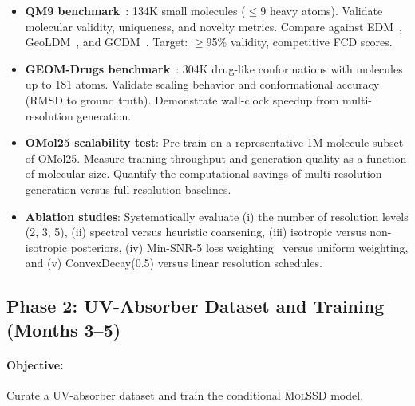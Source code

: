 \documentclass[11pt,a4paper]{article}
\newcommand{\molssd}{\textsc{MolSSD}}
\begin{document}
\begin{itemize}[leftmargin=*]
  \item \textbf{QM9 benchmark}~\citep{ramakrishnan2014qm9}: 134K small molecules
    ($\le$9 heavy atoms). Validate molecular validity, uniqueness, and novelty metrics.
    Compare against EDM~\citep{hoogeboom2022edm}, GeoLDM~\citep{xu2023geoldm}, and
    GCDM~\citep{morehead2024gcdm}. Target: $\ge$95\% validity, competitive FCD scores.

  \item \textbf{GEOM-Drugs benchmark}~\citep{axelrod2022geom}: 304K drug-like
    conformations with molecules up to 181 atoms. Validate scaling behavior and
    conformational accuracy (RMSD to ground truth). Demonstrate wall-clock speedup from
    multi-resolution generation.

  \item \textbf{OMol25 scalability test}: Pre-train on a representative 1M-molecule
    subset of OMol25. Measure training throughput and generation quality as a function
    of molecular size. Quantify the computational savings of multi-resolution generation
    versus full-resolution baselines.

  \item \textbf{Ablation studies}: Systematically evaluate (i) the number of resolution
    levels (2, 3, 5), (ii) spectral versus heuristic coarsening, (iii) isotropic
    versus non-isotropic posteriors, (iv) Min-SNR-5 loss
    weighting~\citep{hang2023minsnr} versus uniform weighting, and (v) ConvexDecay(0.5)
    versus linear resolution schedules.
\end{itemize}

\subsection{Phase 2: UV-Absorber Dataset and Training (Months 3--5)}

\paragraph{Objective:} Curate a UV-absorber dataset and train the conditional \molssd{}
model.
\end{document}
